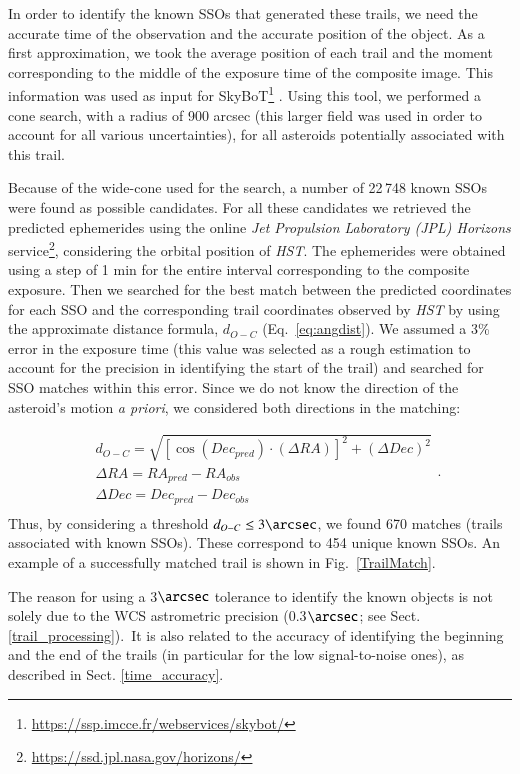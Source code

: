 \documentclass{aa}
\begin{document}
In order to identify the known SSOs that generated these trails, we need the accurate time of the observation and the accurate position of the object.  As a first approximation, we took the average position of each trail and the moment corresponding to the middle of the exposure time of the composite image. This information was used as input for SkyBoT\footnote{\url{https://ssp.imcce.fr/webservices/skybot/}} \citep{SkyBoT2006,Berthier2016}. Using this tool, we performed a cone search, with a radius of 900 arcsec (this larger field was used in order to account for all various uncertainties), for all asteroids potentially associated with this trail. 

Because of the wide-cone used for the search, a number of 22\,748 known SSOs were found as possible candidates. For all these candidates we retrieved the predicted ephemerides using the online \emph{Jet Propulsion Laboratory (JPL) Horizons} service\footnote{\url{https://ssd.jpl.nasa.gov/horizons/}}, considering the orbital position of \textit{HST}. The ephemerides were obtained using a step of 1 min for the entire interval corresponding to the composite exposure. Then we searched for the best match between the predicted coordinates for each SSO and the corresponding trail coordinates observed by \textit{HST} by using the approximate distance formula, $d_{O-C}$ (Eq.~\ref{eq:angdist}). We assumed a 3\% error in the exposure time (this value was selected as a rough estimation to account for the precision in identifying the start of the trail) and searched for SSO matches within this error. Since we do not know the direction of the asteroid's motion \emph{a priori}, we considered both directions in the matching:

\begin{equation}
\begin{aligned}
& d_{O-C} = \sqrt{[\cos(Dec_{pred})\cdot (\Delta RA)]^2 + (\Delta Dec)^2} \\
& \Delta RA = RA_{pred} - RA_{obs} \\
& \Delta Dec = Dec_{pred} - Dec_{obs} \\
\end{aligned}
\label{eq:angdist}
.\end{equation}
Thus, by considering a threshold $d_{O-C} \leq 3\arcsec$, we found 670 matches (trails associated with known SSOs). These correspond to 454 unique known SSOs. An example of a successfully matched trail is shown in Fig.~\ref{TrailMatch}.

The reason for using a 3$\arcsec$ tolerance to identify the known objects is not solely due to the WCS astrometric precision (0.3$\arcsec$; see Sect. \ref{trail_processing}).\ It is also related to the accuracy of identifying the beginning and the end of the trails (in particular for the low signal-to-noise ones), as described in Sect. \ref{time_accuracy}.
\end{document}
